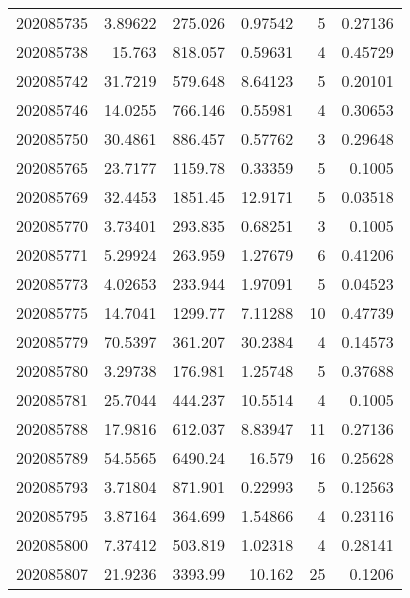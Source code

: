 \begin{tabular}{rrrrrr}
 202085735 &          3.89622 &      275.026  &            0.97542 &           5 & 0.27136 \\
 202085738 &         15.763   &      818.057  &            0.59631 &           4 & 0.45729 \\
 202085742 &         31.7219  &      579.648  &            8.64123 &           5 & 0.20101 \\
 202085746 &         14.0255  &      766.146  &            0.55981 &           4 & 0.30653 \\
 202085750 &         30.4861  &      886.457  &            0.57762 &           3 & 0.29648 \\
 202085765 &         23.7177  &     1159.78   &            0.33359 &           5 & 0.1005  \\
 202085769 &         32.4453  &     1851.45   &           12.9171  &           5 & 0.03518 \\
 202085770 &          3.73401 &      293.835  &            0.68251 &           3 & 0.1005  \\
 202085771 &          5.29924 &      263.959  &            1.27679 &           6 & 0.41206 \\
 202085773 &          4.02653 &      233.944  &            1.97091 &           5 & 0.04523 \\
 202085775 &         14.7041  &     1299.77   &            7.11288 &          10 & 0.47739 \\
 202085779 &         70.5397  &      361.207  &           30.2384  &           4 & 0.14573 \\
 202085780 &          3.29738 &      176.981  &            1.25748 &           5 & 0.37688 \\
 202085781 &         25.7044  &      444.237  &           10.5514  &           4 & 0.1005  \\
 202085788 &         17.9816  &      612.037  &            8.83947 &          11 & 0.27136 \\
 202085789 &         54.5565  &     6490.24   &           16.579   &          16 & 0.25628 \\
 202085793 &          3.71804 &      871.901  &            0.22993 &           5 & 0.12563 \\
 202085795 &          3.87164 &      364.699  &            1.54866 &           4 & 0.23116 \\
 202085800 &          7.37412 &      503.819  &            1.02318 &           4 & 0.28141 \\
 202085807 &         21.9236  &     3393.99   &           10.162   &          25 & 0.1206  \\

\end{tabular}
